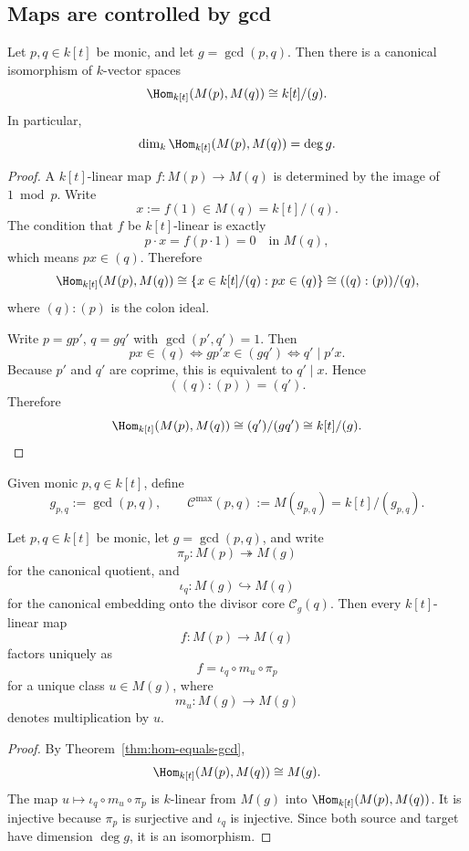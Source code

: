 \subsection{Maps are controlled by gcd}

\begin{theorem}[Hom \(=\) gcd]
\label{thm:hom-equals-gcd}
Let \(p,q\in k[t]\) be monic, and let \(g=\gcd(p,q)\).
Then there is a canonical isomorphism of \(k\)-vector spaces
\[
\Hom_{k[t]}(M(p),M(q))\cong k[t]/(g).
\]
In particular,
\[
\dim_k\Hom_{k[t]}(M(p),M(q))=\deg g.
\]
\end{theorem}

\begin{proof}
A \(k[t]\)-linear map \(f\colon M(p)\to M(q)\) is determined by the image of \(1\bmod p\).
Write
\[
x:=f(1)\in M(q)=k[t]/(q).
\]
The condition that \(f\) be \(k[t]\)-linear is exactly
\[
p\cdot x = f(p\cdot 1)=0 \quad \text{in } M(q),
\]
which means \(px\in (q)\).
Therefore
\[
\Hom_{k[t]}(M(p),M(q))
\cong \{x \in k[t]/(q): px\in (q)\}
\cong ((q):(p))/(q),
\]
where \((q):(p)\) is the colon ideal.

Write \(p=gp'\), \(q=gq'\) with \(\gcd(p',q')=1\).
Then
\[
px\in (q)
\iff gp'x\in (gq')
\iff q' \mid p'x.
\]
Because \(p'\) and \(q'\) are coprime, this is equivalent to \(q'\mid x\).
Hence
\[
((q):(p)) = (q').
\]
Therefore
\[
\Hom_{k[t]}(M(p),M(q))
\cong (q')/(gq')
\cong k[t]/(g).
\]
\end{proof}

\begin{definition}
Given monic \(p,q\in k[t]\), define
\[
g_{p,q}:=\gcd(p,q),
\qquad
\mathcal C^{\max}(p,q):=M(g_{p,q})=k[t]/(g_{p,q}).
\]
\end{definition}

\begin{theorem}
\label{thm:factorization-through-common-core}
Let \(p,q\in k[t]\) be monic, let \(g=\gcd(p,q)\), and write
\[
\pi_p\colon M(p)\twoheadrightarrow M(g)
\]
for the canonical quotient, and
\[
\iota_q\colon M(g)\hookrightarrow M(q)
\]
for the canonical embedding onto the divisor core \(\mathcal C_g(q)\).
Then every \(k[t]\)-linear map
\[
f\colon M(p)\to M(q)
\]
factors uniquely as
\[
f=\iota_q\circ m_u\circ \pi_p
\]
for a unique class \(u\in M(g)\), where
\[
m_u\colon M(g)\to M(g)
\]
denotes multiplication by \(u\).
\end{theorem}

\begin{proof}
By Theorem~\ref{thm:hom-equals-gcd},
\[
\Hom_{k[t]}(M(p),M(q))\cong M(g).
\]
The map \(u\mapsto \iota_q\circ m_u\circ \pi_p\) is \(k\)-linear from \(M(g)\) into \(\Hom_{k[t]}(M(p),M(q))\).
It is injective because \(\pi_p\) is surjective and \(\iota_q\) is injective.
Since both source and target have dimension \(\deg g\), it is an isomorphism.
\end{proof}

